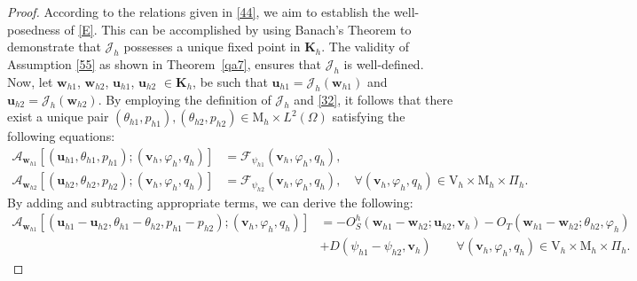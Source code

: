 \documentclass[10pt,a4paper]{article}
\begin{document}
  		\begin{proof}
  			
  			According to the relations given in \eqref{44}, we aim to establish the well-posedness of \eqref{E}. This can be accomplished by using Banach's Theorem to demonstrate that $\mathcal{J}_h$ possesses a unique fixed point in $\boldsymbol{K}_h$.
  			\newline
  			The validity of Assumption \eqref{55} as shown in Theorem~\ref{qa7}, ensures that $\mathcal{J}_h$ is well-defined.
  			Now, let $\boldsymbol{w}_{h1}$, $\boldsymbol{w}_{h2}$, $\boldsymbol{u}_{h1}$, $\boldsymbol{u}_{h2}$ $\in \boldsymbol{K}_h$, be such that $\boldsymbol{u}_{h1}=\mathcal{J}_h\left(\boldsymbol{w}_{h1}\right)$ and $\boldsymbol{u}_{h2}=\mathcal{J}_h\left(\boldsymbol{w}_{h2}\right)$. By employing the definition of 
     $\mathcal{J}_h$ and \eqref{32}, it follows that there exist a unique pair $( \theta_{h1},p_{h1}), (\theta_{h2},p_{h2}) \in \mathrm{M}_h \times {L}^2(\Omega)$ satisfying the following equations:
  		\begin{align*}
        \mathcal{A}_{\boldsymbol{w}_{h1}}\left[\left(\boldsymbol{u}_{h1},\theta_{h1},p_{h1}\right);( \boldsymbol{v}_h,\varphi_h,q_h)\right]& =\mathcal{F}_{\psi_{h1}}(\boldsymbol{v}_h,\varphi_h,q_h), \\ \mathcal{A}_{\boldsymbol{w}_{h2}}\left[\left( \boldsymbol{u}_{h2},\theta_{h2},p_{h2} \right);( \boldsymbol{v}_h,\varphi_h,q_h)\right]&=\mathcal{F}_{\psi_{h2}}(\boldsymbol{v}_h,\varphi_h,q_h), \quad \forall (\boldsymbol{v}_h,\varphi_h,q_h) \in \mathrm{V}_h \times \mathrm{M}_h \times \Pi_h.  
  		\end{align*}
  			By adding and subtracting appropriate terms, we can derive the following:
            \begin{equation} \label{40}
  			\begin{aligned}
  			\mathcal{A}_{\boldsymbol{w}_{h1}}\left[\left( \boldsymbol{u}_{h1}-\boldsymbol{u}_{h2}, \theta_{h1}-\theta_{h2}, p_{h1}-p_{h2}\right);( \boldsymbol{v}_h, \varphi_h,q_h)\right] & =-O_S^h\left(\boldsymbol{w}_{h1}-\boldsymbol{w}_{h2} ;  \boldsymbol{u}_{h2}, \boldsymbol{v}_h \right) -O_T\left(\boldsymbol{w}_{h1}-\boldsymbol{w}_{h2} ;  \theta_{h2}, \varphi_h \right)  \\
            & + D(\psi_{h1} -\psi_{h2},\boldsymbol{v}_h)  \nonumber  \qquad  \forall(\boldsymbol{v}_h,\varphi_h,q_h) \in \mathrm{V}_h \times \mathrm{M}_h \times  \Pi_h.
  			\end{aligned}
            \end{equation}

\end{proof}
\end{document}

